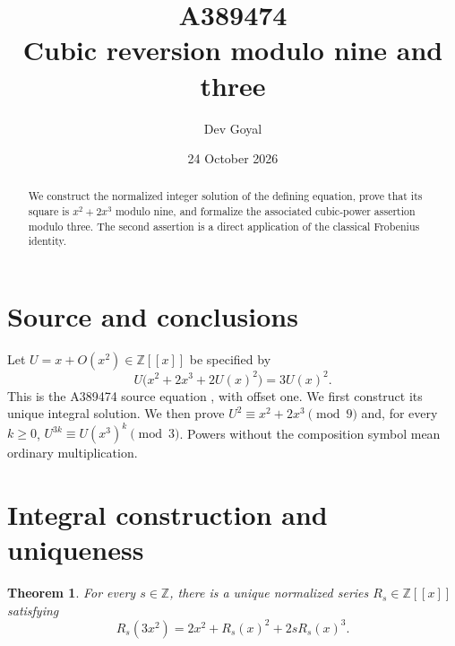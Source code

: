 \documentclass[11pt,a4paper]{article}
\title{A389474\\[3pt]Cubic reversion modulo nine and three}
\author{Dev Goyal}
\date{24 October 2026}
\newtheorem{theorem}{Theorem}[section]
\theoremstyle{remark}
\newcommand{\Z}{\mathbb Z}
\newcommand{\ps}[1]{#1[[x]]}
\begin{document}
\maketitle
\begin{center}
\end{center}
\begin{abstract}
We construct the normalized integer solution of the defining equation, prove that its square is $x^2+2x^3$ modulo nine, and formalize the associated cubic-power assertion modulo three. The second assertion is a direct application of the classical Frobenius identity.
\end{abstract}
\section{Source and conclusions}
Let $U=x+O(x^2)\in\Z[[x]]$ be specified by
\[
U\bigl(x^2+2x^3+2U(x)^2\bigr)=3U(x)^2.
\]
This is the A389474 source equation \cite{oeis}, with offset one.
We first construct its unique integral solution. We then prove
$U^2\equiv x^2+2x^3\pmod9$ and, for every $k\ge0$,
$U^{3k}\equiv U(x^3)^k\pmod3$. Powers without the composition symbol
mean ordinary multiplication.
\section{Integral construction and uniqueness}

\begin{theorem}\label{thm:cubicexist}
For every $s\in\Z$, there is a unique normalized series
$R_s\in\ps{\Z}$ satisfying
\begin{equation}\label{eq:cubicfamily}
R_s(3x^2)=2x^2+R_s(x)^2+2sR_s(x)^3.
\end{equation}
\end{theorem}
\end{document}
